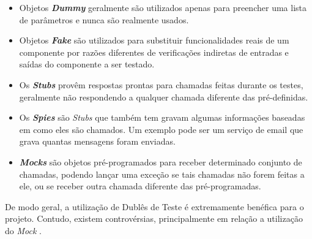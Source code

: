\begin{itemize}
    \item
        Objetos \textbf{\textit{Dummy}} geralmente são utilizados apenas para
        preencher uma lista de parâmetros e nunca são realmente usados.

    \item
        Objetos \textbf{\textit{Fake}} são utilizados para substituir
        funcionalidades reais de um componente por razões diferentes de
        verificações indiretas de entradas e saídas do componente a ser testado.

    \item
        Os \textbf{\textit{Stubs}} provêm respostas prontas para chamadas feitas
        durante os testes, geralmente não respondendo a qualquer chamada
        diferente das pré-definidas.

    \item
        Os \textbf{\textit{Spies}} são \textit{Stubs} que também tem gravam
        algumas informações baseadas em como eles são chamados. Um exemplo pode
        ser um serviço de email que grava quantas mensagens foram enviadas.

    \item
        \textbf{\textit{Mocks}} são objetos pré-programados para receber
        determinado conjunto de chamadas, podendo lançar uma exceção se tais
        chamadas não forem feitas a ele, ou se receber outra chamada diferente
        das pré-programadas.
\end{itemize}

De modo geral, a utilização de Dublês de Teste é extremamente benéfica para o
projeto. Contudo, existem controvérsias, principalmente em relação a utilização
do \textit{Mock} \cite{MocksArentStubs}.
